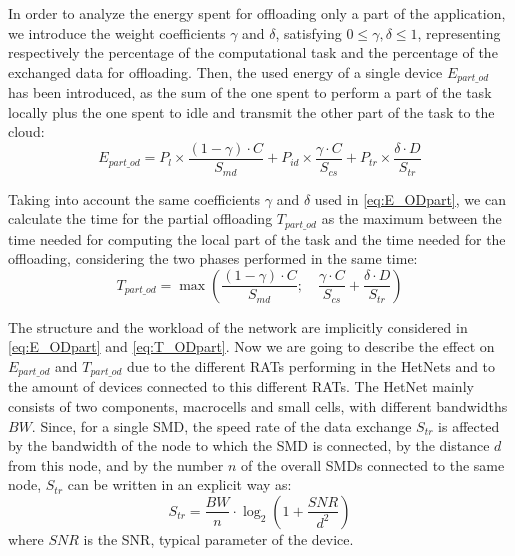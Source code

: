 \documentclass[twoside,openright]{report}
\begin{document}
In order to analyze the energy spent for offloading only a part of the application, we introduce the weight coefficients ${\gamma}$ and ${\delta}$, satisfying ${0 \le \gamma ,\delta \le 1}$, representing respectively the percentage of the computational task and the percentage of the exchanged data for offloading. 
Then, the used energy of a single device ${E_{\textit{part}\_\textit{od}}}$ has been introduced, as the sum of the one spent to perform a part of the task locally plus the one spent to idle and transmit the other part of the task to the cloud:
	\begin{equation}
	E_{\textit{part}\_\textit{od}}  = P_{l}\times\frac{(1-\gamma)\cdot C}{S_{\textit{md}}} 
	+ P_{\textit{id}}\times\frac{\gamma\cdot C}{S_{\textit{cs}}} + P_{\textit{tr}}\times\frac{\delta\cdot D}{S_{\textit{tr}}}
	\label{eq:E_ODpart}
	\end{equation}

Taking into account the same coefficients $\gamma$ and $\delta$ used in \autoref{eq:E_ODpart}, we can calculate the time for the partial offloading ${T_{\textit{part}\_\textit{od}}}$ as  the maximum between the time needed for computing the local part of the task and the time needed for the offloading, considering the two phases performed in the same time:
	\begin{equation}
	\label{eq:T_ODpart}
	T_{\textit{part}\_\textit{od}} = \max \left(\frac{(1-\gamma)\cdot C}{S_{\textit{md}}};\quad\frac{\gamma\cdot C}{S_{\textit{cs}}} + \frac{\delta\cdot D}{S_{\textit{tr}}}\right)
	\end{equation}

The structure and the workload of the network are implicitly considered in \autoref{eq:E_ODpart} and \autoref{eq:T_ODpart}. 
Now we are going to describe the effect on ${E_{\textit{part}\_\textit{od}}}$ and ${T_{\textit{part}\_\textit{od}}}$ due to the different \glspl{RAT} performing in the \glspl{HetNet} and to the amount of devices connected to this different  \glspl{RAT}.
The \gls{HetNet} mainly consists of two components, macrocells and small cells, with different bandwidths ${\textit{BW}}$. 
Since, for a single \gls{SMD}, the speed rate of the data exchange ${S_{\textit{tr}}}$ is affected by the bandwidth of the node to which the \gls{SMD} is connected, by the distance ${d}$ from this node, and by the number ${n}$ of the overall \glspl{SMD} connected to the same node, ${S_{tr}}$ can be written in an explicit way as:
 	\begin{equation}
	\label{eq:Str}
	S_{tr} = \frac{\textit{BW}}{n}\cdot \log_2{\left(1+\frac{\textit{SNR}}{d^2}\right)}
	\end{equation}   
	where  $\textit{SNR}$ is the \gls{SNR}, typical parameter of the device.
 
\end{document}
